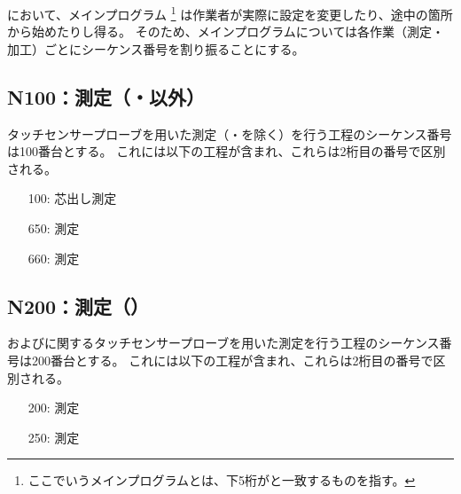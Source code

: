 \clearpage
\DMC において、メインプログラム
\footnote{ここでいうメインプログラムとは、下5桁が\DrawingNumber と一致するものを指す。}
は作業者が実際に設定を変更したり、途中の箇所から始めたりし得る。
そのため、メインプログラムについては各作業（測定・加工）ごとにシーケンス番号を割り振ることにする。


\subsection{N100：測定（\Dimple ・\ReliefGroove 以外）}
タッチセンサープローブを用いた測定（\Dimple ・\ReliefGroove を除く）を行う工程のシーケンス番号は100番台とする。
これには以下の工程が含まれ、これらは2桁目の番号で区別される。
\begin{enumerate}
\item[100:] 芯出し測定
\item[650:] \nameCenterlineEndFaceDifAC 測定
\item[660:] \nameCenterlineEndFaceDifBD 測定
\end{enumerate}


\subsection{N200：測定（\Dimple）}
\Dimple および\ReliefGroove に関するタッチセンサープローブを用いた測定を行う工程のシーケンス番号は200番台とする。
これには以下の工程が含まれ、これらは2桁目の番号で区別される。
\begin{enumerate}
\item[200:] \Dimple 測定
\item[250:] \ReliefGroove 測定
\end{enumerate}


